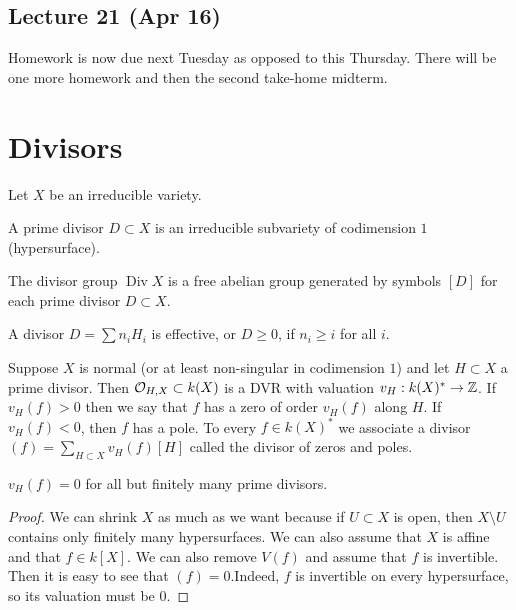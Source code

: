 \documentclass[twoside, 10pt]{article}
\begin{document}
        \subsection{Lecture 21 (Apr 16)}
        Homework is now due next Tuesday as opposed to this Thursday. There will be one more homework and then the second take-home midterm.
        
        \section{Divisors}
        Let $X$ be an irreducible variety.

        \begin{defn}
            A prime divisor $D \subset X$ is an irreducible subvariety of codimension $1$ (hypersurface).
        \end{defn}

        \begin{defn}
            The divisor group $\operatorname{Div} X$ is a free abelian group generated by symbols $[D]$ for each prime divisor $D \subset X$.
        \end{defn}

        \begin{defn}
            A divisor $D = \sum n_i H_i$ is effective, or $D \geq 0$, if $n_i \geq i$ for all $i$.
        \end{defn}

        Suppose $X$ is normal (or at least non-singular in codimension $1$) and let $H \subset X$ a prime divisor. Then $\mathcal{O}_{H,X} \subset k(X)$ is a DVR with valuation $v_H: k(X)^* \to \mathbb{Z}$. If $v_H(f) > 0$ then we say that $f$ has a zero of order $v_H(f)$ along $H$. If $v_H(f) < 0$, then $f$ has a pole. To every $f \in k(X)^*$ we associate a divisor $(f) = \sum_{H \subset X} v_H(f)[H]$ called the divisor of zeros and poles.

        \begin{lem}
            $v_H(f) = 0$ for all but finitely many prime divisors.
            \begin{proof}
                We can shrink $X$ as much as we want because if $U \subset X$ is open, then $X \setminus  U$ contains only finitely many hypersurfaces. We can also assume that $X$ is affine and that $f \in k[X]$. We can also remove $V(f)$ and assume that $f$ is invertible. Then it is easy to see that $(f) = 0$.Indeed, $f$ is invertible on every hypersurface, so its valuation must be $0$.
            \end{proof}
        \end{lem}
\end{document}
